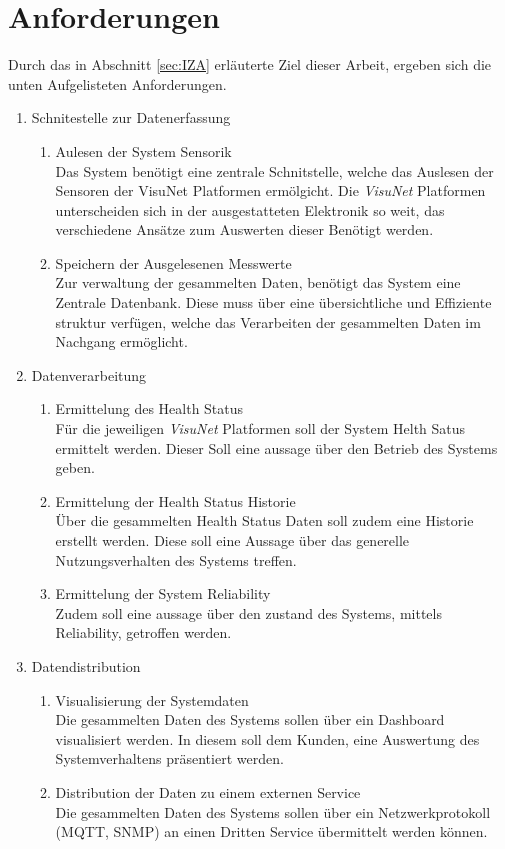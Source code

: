 \section{Anforderungen}
Durch das in Abschnitt \ref{sec:IZA} erläuterte Ziel dieser Arbeit, ergeben sich die unten Aufgelisteten Anforderungen.
\begin{enumerate}
    \item Schnitestelle zur Datenerfassung
    \begin{enumerate}
        \item Aulesen der System Sensorik\\
        Das System benötigt eine zentrale Schnitstelle, welche das Auslesen der Sensoren der VisuNet Platformen ermölgicht. Die \textit{VisuNet} Platformen unterscheiden sich in der ausgestatteten Elektronik so weit, das verschiedene Ansätze zum Auswerten dieser Benötigt werden. 
        \item Speichern der Ausgelesenen Messwerte\\
        Zur verwaltung der gesammelten Daten, benötigt das System eine Zentrale Datenbank. Diese muss über eine übersichtliche und Effiziente struktur verfügen, welche das Verarbeiten der gesammelten Daten im Nachgang ermöglicht.
    \end{enumerate}
    
    \item Datenverarbeitung
    \begin{enumerate}
        \item Ermittelung des Health Status\\
        Für die jeweiligen \textit{VisuNet} Platformen soll der System Helth Satus ermittelt werden. Dieser Soll eine aussage über den Betrieb des Systems geben. 
        \item Ermittelung der Health Status Historie\\
        Über die gesammelten Health Status Daten soll zudem eine Historie erstellt werden. Diese soll eine Aussage über das generelle Nutzungsverhalten des Systems treffen. 
        \item Ermittelung der System Reliability\\
        Zudem soll eine aussage über den zustand des Systems, mittels Reliability, getroffen werden. 
    \end{enumerate}

    \item Datendistribution
    \begin{enumerate}
        \item Visualisierung der Systemdaten\\
        Die gesammelten Daten des Systems sollen über ein Dashboard visualisiert werden. In diesem soll dem Kunden, eine Auswertung des Systemverhaltens präsentiert werden. 
        \item Distribution der Daten zu einem externen Service\\
        Die gesammelten Daten des Systems sollen über ein Netzwerkprotokoll (MQTT, SNMP) an einen Dritten Service übermittelt werden können.
    \end{enumerate}

   \end{enumerate}

